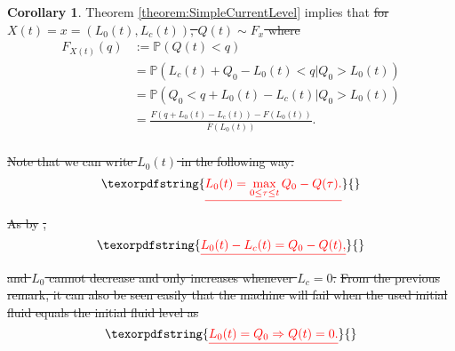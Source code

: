\documentclass[a4paper]{thesis}
\theoremstyle{definition}
\newtheorem{remark}{Remark}[chapter]
\newtheorem{corollary}{Corollary}[chapter]
\providecommand{\DIFaddtex}[1]{{\protect\color{blue}\uwave{#1}}} %
\providecommand{\DIFdeltex}[1]{{\protect\color{red}\sout{#1}}}                      %
\providecommand{\DIFaddbegin}{} %
\providecommand{\DIFaddend}{} %
\providecommand{\DIFdelbegin}{} %
\providecommand{\DIFdelend}{} %
\providecommand{\DIFadd}[1]{\texorpdfstring{\DIFaddtex{#1}}{#1}} %
\providecommand{\DIFdel}[1]{\texorpdfstring{\DIFdeltex{#1}}{}} %
\newcommand{\DIFscaledelfig}{0.5}
\newlength{\DIFdelgraphicswidth} %
\newlength{\DIFdelgraphicsheight} %
\newcommand{\DIFaddincludegraphics}[2][]{{\color{blue}\fbox{\DIFOincludegraphics[#1]{#2}}}} %
\newcommand{\DIFdelincludegraphics}[2][]{%
	\sbox{\DIFdelgraphicsbox}{\DIFOincludegraphics[#1]{#2}}%
	\settoboxwidth{\DIFdelgraphicswidth}{\DIFdelgraphicsbox} %
	\settoboxtotalheight{\DIFdelgraphicsheight}{\DIFdelgraphicsbox} %
	\scalebox{\DIFscaledelfig}{%
		\parbox[b]{\DIFdelgraphicswidth}{\usebox{\DIFdelgraphicsbox}\\[-\baselineskip] \rule{\DIFdelgraphicswidth}{0em}}\llap{\resizebox{\DIFdelgraphicswidth}{\DIFdelgraphicsheight}{%
				\setlength{\unitlength}{\DIFdelgraphicswidth}%
				\begin{picture}(1,1)%
				\thicklines\linethickness{2pt} %
				{\color[rgb]{1,0,0}\put(0,0){\framebox(1,1){}}}%
				{\color[rgb]{1,0,0}\put(0,0){\line( 1,1){1}}}%
				{\color[rgb]{1,0,0}\put(0,1){\line(1,-1){1}}}%
				\end{picture}%
			}\hspace*{3pt}}} %
} %
\DeclareRobustCommand{\DIFaddbegin}{\DIFOaddbegin \let\includegraphics\DIFaddincludegraphics} %
\DeclareRobustCommand{\DIFaddend}{\DIFOaddend \let\includegraphics\DIFOincludegraphics} %
\DeclareRobustCommand{\DIFdelbegin}{\DIFOdelbegin \let\includegraphics\DIFdelincludegraphics} %
\DeclareRobustCommand{\DIFdelend}{\DIFOaddend \let\includegraphics\DIFOincludegraphics} %
\begin{document}
	\begin{corollary}\label{corollary:SimpleFluidDistribution}
		Theorem \ref{theorem:SimpleCurrentLevel} implies that \DIFdelbegin \DIFdel{for $X(t)=x=(L_0(t),L_c(t))$, $Q(t)\sim F_x$ where
		}\DIFdelend \DIFaddbegin \DIFadd{$Q(t)\sim F_{X(t)}$, where
		}\DIFaddend \begin{equation}\label{eq:SimpleCurrentDistribution}
		\DIFdelbegin %
		\DIFdelend \DIFaddbegin \begin{split}
		F_{X(t)}(q)&:=\mathbb{P}(Q(t)<q)\\
		&=\mathbb{P}(L_c(t)+Q_0-L_0(t)<q|Q_0>L_0(t))\\
		&=\mathbb{P}(Q_0<q+L_0(t)-L_c(t)|Q_0>L_0(t))\\
		&=\frac{F(q+L_0(t)-L_c(t))-F(L_0(t))}{\bar{F}(L_0(t))}.\\
		\end{split}
		\DIFaddend \end{equation}
	\end{corollary}
	\DIFdelbegin %
	\DIFdel{Note that we can write $L_0(t)$ in the following way:
	}\[
	\DIFdel{L_0(t)=\max\limits_{0\leq\tau\leq t} Q_0-Q(\tau).
	}\]
	\DIFdel{As by }%
	\DIFdel{, 
	}\[
	\DIFdel{L_0(t)-L_c(t)=Q_0-Q(t),
	}\]
	\DIFdel{and $L_0$ cannot decrease and only increases whenever $L_c=0$.
	}%
	\DIFdel{From the previous remark, it can also be seen easily that the machine will fail when the used initial fluid equals the initial fluid level as
	}\[
	\DIFdel{L_0(t)=Q_0\Rightarrow Q(t)=0.
	}\]
	\DIFdelend 
	
\end{document}
